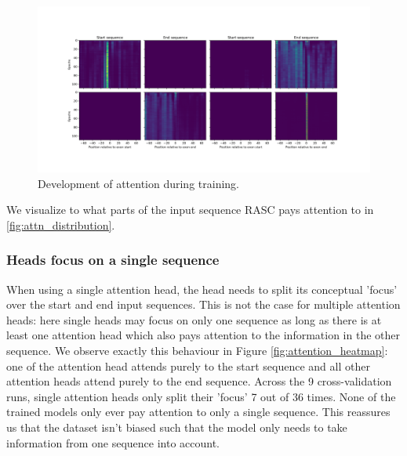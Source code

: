 \begin{figure}
	\centering\includegraphics[width=1\textwidth]{../visualizations/ch5-results/attention_heatmap.png} 
	\caption{Development of attention during training. }
	\label{fig:attn_heatmap}
\end{figure}

We visualize to what parts of the input sequence RASC pays attention to in \ref{fig:attn_distribution}. 



\subsubsection{Heads focus on a single sequence} 
When using a single attention head, the head needs to split its conceptual 'focus' over the start and end input sequences. This is not the case for multiple attention heads: here single heads may focus on only one sequence as long as there is at least one attention head which also pays attention to the information in the other sequence. We observe exactly this behaviour in Figure \ref{fig:attention_heatmap}: one of the attention head attends purely to the start sequence and all other attention heads attend purely to the end sequence. Across the 9 cross-validation runs, single attention heads only split their 'focus' 7 out of 36 times. None of the trained models only ever pay attention to only a single sequence. This reassures us that the dataset isn't biased such that the model only needs to take information from one sequence into account. 

